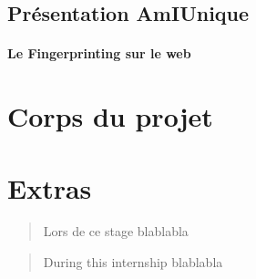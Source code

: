 \documentclass[oneside,a4paper,12pt]{article}
\begin{document}
\subsection{Présentation AmIUnique}

\paragraph*{Le Fingerprinting sur le web}


\cite{fingerprinting}

\section{Corps du projet}


\section{Extras}


\newpage

\appendix
\printbibliography

\newpage

\begin{center}
	
	\vspace{2cm}
	\renewcommand{\abstractname}{Résumé}
	\begin{abstract}
	
	Lors de ce stage blablabla

	\end{abstract}
	\vspace{\fill}	
	\renewcommand{\abstractname}{Abstract}
	\begin{abstract}
	
	During this internship blablabla

	\end{abstract}

	\vspace{2cm}

\end{center}
\end{document}
